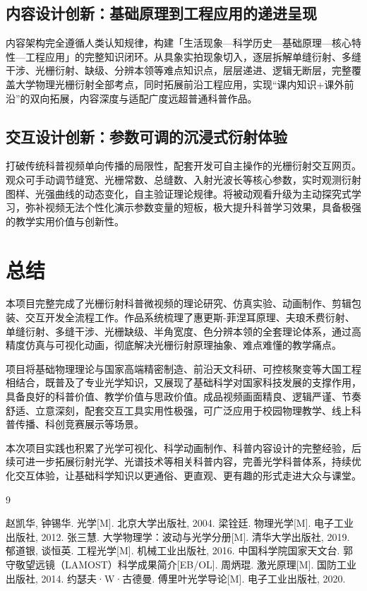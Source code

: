 \documentclass[12pt,a4paper]{ctexrep}
\renewcommand{\bibname}{参考资料}
\begin{document}
\subsection{内容设计创新：基础原理到工程应用的递进呈现}

内容架构完全遵循人类认知规律，构建「生活现象—科学历史—基础原理—核心特性—工程应用」的完整知识闭环。从具象实拍现象切入，逐层拆解单缝衍射、多缝干涉、光栅衍射、缺级、分辨本领等难点知识点，层层递进、逻辑无断层，完整覆盖大学物理光栅衍射全部考点，同时拓展前沿工程应用，实现“课内知识+课外前沿”的双向拓展，内容深度与适配广度远超普通科普作品。

\subsection{交互设计创新：参数可调的沉浸式衍射体验}

打破传统科普视频单向传播的局限性，配套开发可自主操作的光栅衍射交互网页。观众可手动调节缝宽、光栅常数、总缝数、入射光波长等核心参数，实时观测衍射图样、光强曲线的动态变化，自主验证理论规律。将被动观看升级为主动探究式学习，弥补视频无法个性化演示参数变量的短板，极大提升科普学习效果，具备极强的教学实用价值与创新性。

\section{总结}

本项目完整完成了光栅衍射科普微视频的理论研究、仿真实验、动画制作、剪辑包装、交互开发全流程工作。作品系统梳理了惠更斯-菲涅耳原理、夫琅禾费衍射、单缝衍射、多缝干涉、光栅缺级、半角宽度、色分辨本领的全套理论体系，通过高精度仿真与可视化动画，彻底解决光栅衍射原理抽象、难点难懂的教学痛点。

项目将基础物理理论与国家高端精密制造、前沿天文科研、可控核聚变等大国工程相结合，既普及了专业光学知识，又展现了基础科学对国家科技发展的支撑作用，具备良好的科普价值、教学价值与思政价值。成品视频画面精良、逻辑严谨、节奏舒适、立意深刻，配套交互工具实用性极强，可广泛应用于校园物理教学、线上科普传播、科创竞赛展示等场景。

本次项目实践也积累了光学可视化、科学动画制作、科普内容设计的完整经验，后续可进一步拓展衍射光学、光谱技术等相关科普内容，完善光学科普体系，持续优化交互体验，让基础科学知识以更通俗、更直观、更有趣的形式走进大众与课堂。

\begin{thebibliography}{9}
\addcontentsline{toc}{chapter}{\bibname}
 赵凯华, 钟锡华. 光学[M]. 北京大学出版社, 2004.
 梁铨廷. 物理光学[M]. 电子工业出版社, 2012.
 张三慧. 大学物理学：波动与光学分册[M]. 清华大学出版社, 2019.
 郁道银, 谈恒英. 工程光学[M]. 机械工业出版社, 2016.
 中国科学院国家天文台. 郭守敬望远镜（LAMOST）科学成果简介[EB/OL].
 周炳琨. 激光原理[M]. 国防工业出版社, 2014.
 约瑟夫·W·古德曼. 傅里叶光学导论[M]. 电子工业出版社, 2020.
\end{thebibliography}
\end{document}
